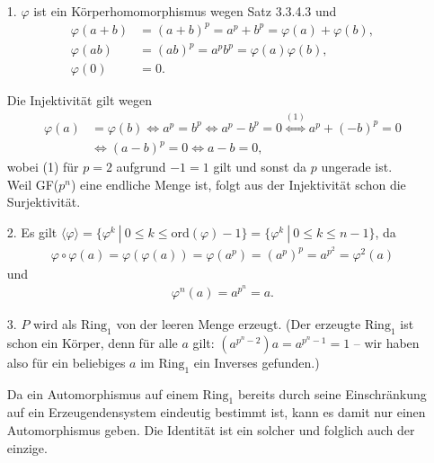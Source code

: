 \begin{solution}\leavevmode \\
    \begin{itemize}
        \item[1.] $\varphi$ ist ein Körperhomomorphismus wegen Satz 3.3.4.3 und
        \begin{align*}
            \varphi(a + b) &= (a + b)^p = a^p + b^p = \varphi(a) + \varphi(b), \\
            \varphi(ab) &= (ab)^p = a^p b^p = \varphi(a) \varphi(b), \\
            \varphi(0) &= 0.
        \end{align*}

    Die Injektivität gilt wegen
    \begin{align*}
        \varphi(a) &= \varphi(b) \Longleftrightarrow a^p = b^p
        \iff a^p - b^p = 0 \stackrel{(1)}{\iff} a^p + (-b)^p = 0 \\ &
        \Longleftrightarrow (a-b)^p = 0  \Longleftrightarrow a - b = 0,
    \end{align*}
    wobei (1) für $p = 2$ aufgrund $-1 = 1$ gilt und sonst da $p$ ungerade ist. \\
    Weil GF($p^n$) eine endliche Menge ist, folgt aus der Injektivität schon die Surjektivität.

    \item[2.] Es gilt $\langle\varphi\rangle =
    \{\varphi^k~|~ 0 \leq k \leq \mathrm{ord}(\varphi) - 1\}
    = \{\varphi^k~|~ 0 \leq k \leq n - 1\}$, da
     \begin{align*}
      \varphi\circ\varphi(a) = \varphi(\varphi(a)) = \varphi(a^p) = (a^p)^p = a^{p^2} = \varphi^2(a)
    \end{align*}
    und
    \begin{align*}
      \varphi^n(a) = a^{p^n} = a.
    \end{align*}

    \item[3.] $P$ wird als $\mathrm{Ring}_1$ von der leeren Menge erzeugt. (Der erzeugte $\mathrm{Ring}_1$ ist schon ein Körper, denn für alle $a$ gilt: $(a^{p^n-2}) a = a^{p^n-1} = 1$ -- wir haben also für ein beliebiges $a$ im $\mathrm{Ring}_1$ ein Inverses gefunden.)

    Da ein Automorphismus auf einem $\mathrm{Ring}_1$ bereits durch seine Einschränkung auf ein Erzeugendensystem eindeutig bestimmt ist, kann es damit nur einen Automorphismus geben. Die Identität ist ein solcher und folglich auch der einzige.


\end{itemize}
\end{solution}

